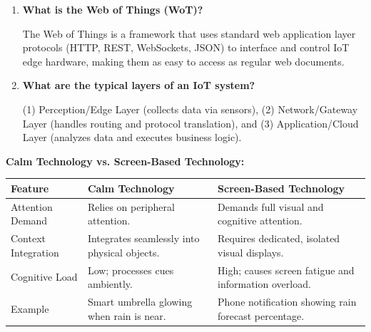 \documentclass[12pt,a4paper]{article}
\newcommand{\Q}[1]{\textbf{#1}\par\noindent\ignorespaces}
\renewcommand{\arraystretch}{1.45}
\begin{document}
\begin{tcolorbox}[exambox, title={\textbf{Frequently Asked / Viva Questions}}]
\begin{enumerate}[leftmargin=*, topsep=0pt, label=\textbf{Q\arabic*.}, itemsep=6pt]
  \item \Q{What is the Web of Things (WoT)?}
        The Web of Things is a framework that uses standard web application layer protocols (HTTP, REST, WebSockets, JSON) to interface and control IoT edge hardware, making them as easy to access as regular web documents.
        
  \item \Q{What are the typical layers of an IoT system?}
        (1) Perception/Edge Layer (collects data via sensors), (2) Network/Gateway Layer (handles routing and protocol translation), and (3) Application/Cloud Layer (analyzes data and executes business logic).
\end{enumerate}
\end{tcolorbox}

\vspace{6pt}

\begin{tcolorbox}[tikzbox, title={\textbf{Comparison Snapshot}}]
\textbf{Calm Technology vs. Screen-Based Technology:}\par\vspace{6pt}\noindent
{\renewcommand{\arraystretch}{1.35}%
\begin{tabularx}{\linewidth}{|B{3.2cm}|Y|Y|}
\hline
\textbf{Feature} & \textbf{Calm Technology} & \textbf{Screen-Based Technology} \\
\hline
Attention Demand & Relies on peripheral attention. & Demands full visual and cognitive attention. \\
\hline
Context Integration & Integrates seamlessly into physical objects. & Requires dedicated, isolated visual displays. \\
\hline
Cognitive Load & Low; processes cues ambiently. & High; causes screen fatigue and information overload. \\
\hline
Example & Smart umbrella glowing when rain is near. & Phone notification showing rain forecast percentage. \\
\hline
\end{tabularx}}
\end{tcolorbox}
\end{document}
